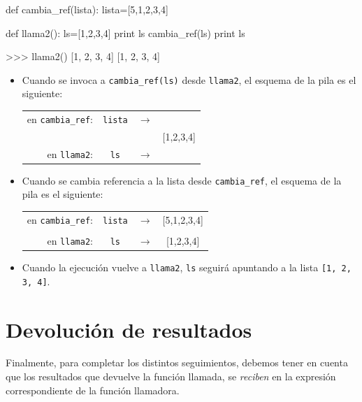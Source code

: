 \begin{codigo-python-sn}
def cambia_ref(lista):
    lista=[5,1,2,3,4]

def llama2():
    ls=[1,2,3,4]
    print ls
    cambia_ref(ls)
    print ls
\end{codigo-python-sn}

\begin{codigo-python-sn}
>>> llama2()
[1, 2, 3, 4]
[1, 2, 3, 4]
\end{codigo-python-sn}

\begin{itemize}

\item Cuando se invoca a \lstinline|cambia_ref(ls)| desde
\lstinline|llama2|, el esquema de la pila es el siguiente:

\begin{tabular}{rcc|c|}
en \lstinline|cambia_ref|:&\lstinline!lista!& $\rightarrow$ & \\
                          &                 &               & [1,2,3,4] \\
en \lstinline|llama2|:&\lstinline!ls!& $\rightarrow$ &  \\
\end{tabular}

\item Cuando se cambia referencia a la lista desde \verb|cambia_ref|, el esquema de la pila es
el siguiente:

\begin{tabular}{rcc|c|}
en \lstinline|cambia_ref|:&\lstinline!lista!& $\rightarrow$ & [5,1,2,3,4]\\
[0cm] \\
en \lstinline|llama2|:&\lstinline!ls!& $\rightarrow$ &  [1,2,3,4]\\
\end{tabular}

\item Cuando la ejecución vuelve a \lstinline|llama2|, \lstinline!ls!
seguirá apuntando a la lista \lstinline|[1, 2, 3, 4]|.

\end{itemize}

\section{Devolución de resultados}

Finalmente, para completar los distintos seguimientos, debemos tener en
cuenta que los resultados que devuelve la función llamada, se {\it reciben}
en la expresión correspondiente de la función llamadora.

